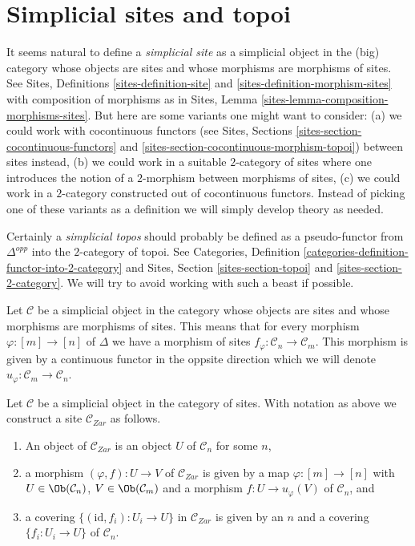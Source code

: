 \section{Simplicial sites and topoi}
\label{section-simplicial-sites}

\noindent
It seems natural to define a {\it simplicial site} as a simplicial
object in the (big) category whose objects are sites
and whose morphisms are morphisms of sites.
See Sites, Definitions \ref{sites-definition-site} and
\ref{sites-definition-morphism-sites}
with composition of morphisms as in 
Sites, Lemma \ref{sites-lemma-composition-morphisms-sites}.
But here are some variants one might want to consider:
(a) we could work with cocontinuous functors
(see Sites, Sections \ref{sites-section-cocontinuous-functors} and
\ref{sites-section-cocontinuous-morphism-topoi}) between sites instead,
(b) we could work in a suitable $2$-category of sites where one introduces
the notion of a $2$-morphism between morphisms of sites,
(c) we could work in a $2$-category constructed out of cocontinuous
functors. Instead of picking one of these variants as a definition
we will simply develop theory as needed.

\medskip\noindent
Certainly a {\it simplicial topos} should probably be defined as a
pseudo-functor from $\Delta^{opp}$ into the $2$-category of topoi.
See Categories, Definition \ref{categories-definition-functor-into-2-category}
and Sites, Section \ref{sites-section-topoi} and
\ref{sites-section-2-category}. We will try to avoid working with such
a beast if possible.

\medskip\noindent
Let $\mathcal{C}$ be a simplicial object in the category whose objects
are sites and whose morphisms are morphisms of sites. This means that
for every morphism $\varphi : [m] \to [n]$ of $\Delta$ we have a morphism
of sites $f_\varphi : \mathcal{C}_n \to \mathcal{C}_m$. This morphism is
given by a continuous functor in the oppsite direction which we will denote
$u_\varphi : \mathcal{C}_m \to \mathcal{C}_n$.

\begin{lemma}
\label{lemma-simplicial-site-site}
Let $\mathcal{C}$ be a simplicial object in the category of sites.
With notation as above we construct a site $\mathcal{C}_{Zar}$ as follows.
\begin{enumerate}
\item An object of $\mathcal{C}_{Zar}$ is an object $U$ of
$\mathcal{C}_n$ for some $n$,
\item a morphism $(\varphi, f) : U \to V$ of $\mathcal{C}_{Zar}$
is given by a map $\varphi : [m] \to [n]$ with
$U \in \Ob(\mathcal{C}_n)$, $V \in \Ob(\mathcal{C}_m)$
and a morphism $f : U \to u_\varphi(V)$ of $\mathcal{C}_n$, and
\item a covering $\{(\text{id}, f_i) :  U_i \to U\}$ in $\mathcal{C}_{Zar}$
is given by an $n$ and a covering $\{f_i : U_i \to U\}$
of $\mathcal{C}_n$.
\end{enumerate}
\end{lemma}

